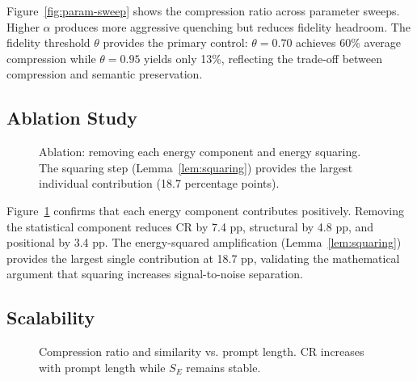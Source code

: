 \documentclass[11pt]{article}
\theoremstyle{remark}
\begin{document}
Figure~\ref{fig:param-sweep} shows the compression ratio across parameter sweeps.
Higher $\alpha$ produces more aggressive quenching but reduces fidelity headroom.
The fidelity threshold $\theta$ provides the primary control: $\theta = 0.70$
achieves 60\% average compression while $\theta = 0.95$ yields only 13\%, reflecting
the trade-off between compression and semantic preservation.

\subsection{Ablation Study}

\begin{figure}[H]
\centering
{}
\caption{Ablation: removing each energy component and energy squaring. The squaring step (Lemma~\ref{lem:squaring}) provides the largest individual contribution (18.7 percentage points).}
\label{fig:ablation}
\end{figure}

Figure~\ref{fig:ablation} confirms that each energy component contributes
positively. Removing the statistical component reduces CR by 7.4 pp,
structural by 4.8 pp, and positional by 3.4 pp. The energy-squared
amplification (Lemma~\ref{lem:squaring}) provides the largest single
contribution at 18.7 pp, validating the mathematical argument that
squaring increases signal-to-noise separation.

\subsection{Scalability}

\begin{figure}[H]
\centering
{}
\caption{Compression ratio and similarity vs. prompt length. CR increases with prompt length while $S_E$ remains stable.}
\label{fig:scalability}
\end{figure}
\end{document}
